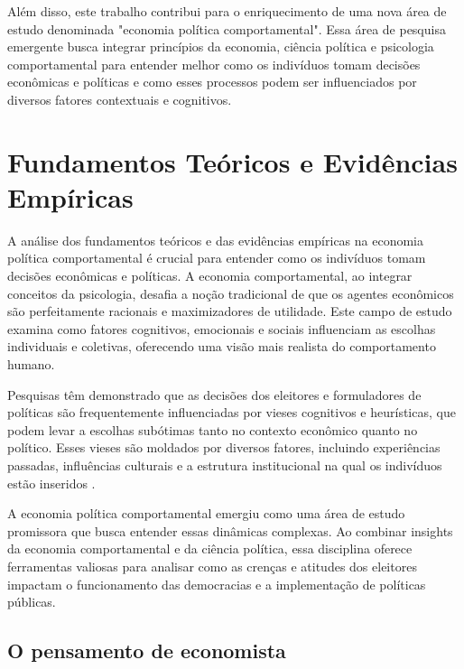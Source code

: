 Além disso, este trabalho contribui para o enriquecimento de uma nova área de estudo denominada "economia política comportamental". Essa área de pesquisa emergente busca integrar princípios da economia, ciência política e psicologia comportamental para entender melhor como os indivíduos tomam decisões econômicas e políticas e como esses processos podem ser influenciados por diversos fatores contextuais e cognitivos.

\section{Fundamentos Teóricos e Evidências Empíricas}

A análise dos fundamentos teóricos e das evidências empíricas na economia política comportamental é crucial para entender como os indivíduos tomam decisões econômicas e políticas. A economia comportamental, ao integrar conceitos da psicologia, desafia a noção tradicional de que os agentes econômicos são perfeitamente racionais e maximizadores de utilidade. Este campo de estudo examina como fatores cognitivos, emocionais e sociais influenciam as escolhas individuais e coletivas, oferecendo uma visão mais realista do comportamento humano.

Pesquisas têm demonstrado que as decisões dos eleitores e formuladores de políticas são frequentemente influenciadas por vieses cognitivos e heurísticas, que podem levar a escolhas subótimas tanto no contexto econômico quanto no político. Esses vieses são moldados por diversos fatores, incluindo experiências passadas, influências culturais e a estrutura institucional na qual os indivíduos estão inseridos \cite{The_Myth_of_the_Rational_Voter, Systematically_Biased_Beliefs_about_Economics, saee1996}. 

A economia política comportamental emergiu como uma área de estudo promissora que busca entender essas dinâmicas complexas. Ao combinar insights da economia comportamental e da ciência política, essa disciplina oferece ferramentas valiosas para analisar como as crenças e atitudes dos eleitores impactam o funcionamento das democracias e a implementação de políticas públicas.


\subsection{O pensamento de economista} 

